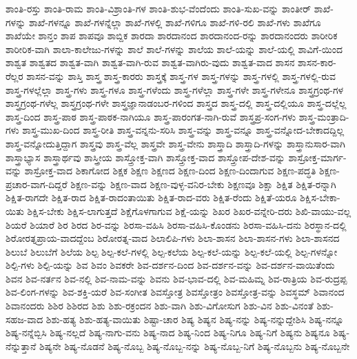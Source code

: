{ಶಾಂತಿ-ರಸ್ತು
ಶಾಂತಿ-ರಾಮ
ಶಾಂತಿ-ವಿಶ್ರಾಂತಿ-ಗಳ
ಶಾಂತಿ-ಶುಭ-ವೆಂದೆಂದು
ಶಾಂತಿ-ಸುಖ-ವನ್ನು
ಶಾಂತೀರ್
ಶಾಖೆ-ಗಳನ್ನು
ಶಾಖೆ-ಗಳನ್ನೂ
ಶಾಖೆ-ಗಳನ್ನೆಲ್ಲಾ
ಶಾಖೆ-ಗಳಲ್ಲಿ
ಶಾಖೆ-ಗಳಿಗೂ
ಶಾಖೆ-ಗಳಿ-ರಲಿ
ಶಾಖೆ-ಗಳು
ಶಾಖೆಗೂ
ಶಾಖೆಯೇ
ಶಾನ್ತಂ
ಶಾಪ
ಶಾಪವೂ
ಶಾಬ್ದಿಕ
ಶಾರದಾ
ಶಾರದಾನಂದ
ಶಾರದಾನಂದ-ರನ್ನು
ಶಾರದಾನಂದರು
ಶಾರೀರಿಕ
ಶಾರೀರಿಕ-ವಾಗಿ
ಶಾಲಾ-ಕಾಲೇಜು-ಗಳನ್ನು
ಶಾಲೆ
ಶಾಲೆ-ಗಳನ್ನು
ಶಾಲೆಯ
ಶಾಲೆ-ಯನ್ನು
ಶಾಲೆ-ಯಲ್ಲಿ
ಶಾವಿಗೆ-ಯಿಂದ
ಶಾಶ್ವತ
ಶಾಶ್ವತದ
ಶಾಶ್ವತ-ವಾಗಿ
ಶಾಶ್ವತ-ವಾಗಿ-ರುವ
ಶಾಶ್ವತ-ವಾಗಿರು-ವುದು
ಶಾಶ್ವತ-ವಾದ
ಶಾಸನ
ಶಾಸನ-ಕಾರ-ರೆಲ್ಲರ
ಶಾಸನ-ವನ್ನು
ಶಾಸ್ತಿ
ಶಾಸ್ತ್ರ
ಶಾಸ್ತ್ರ-ಕಾರರು
ಶಾಸ್ತ್ರಕ್ಕೆ
ಶಾಸ್ತ್ರ-ಗಳ
ಶಾಸ್ತ್ರ-ಗಳನ್ನು
ಶಾಸ್ತ್ರ-ಗಳಲ್ಲಿ
ಶಾಸ್ತ್ರ-ಗಳಲ್ಲಿ-ರುವ
ಶಾಸ್ತ್ರ-ಗಳಲ್ಲೆಲ್ಲಾ
ಶಾಸ್ತ್ರ-ಗಳು
ಶಾಸ್ತ್ರ-ಗಳೂ
ಶಾಸ್ತ್ರ-ಗಳೆಂದು
ಶಾಸ್ತ್ರ-ಗಳೆಲ್ಲಾ
ಶಾಸ್ತ್ರ-ಗಳೇ
ಶಾಸ್ತ್ರ-ಗಳೇನೂ
ಶಾಸ್ತ್ರಗ್ರಂಥ-ಗಳ
ಶಾಸ್ತ್ರಗ್ರಂಥ-ಗಳೆಲ್ಲ
ಶಾಸ್ತ್ರಗ್ರಂಥ-ಗಳೇ
ಶಾಸ್ತ್ರಜ್ಞಾನಾಡಂಬರ-ಗಳಿಂದ
ಶಾಸ್ತ್ರದ
ಶಾಸ್ತ್ರ-ದಲ್ಲಿ
ಶಾಸ್ತ್ರ-ದಲ್ಲಿಯೂ
ಶಾಸ್ತ್ರ-ದಲ್ಲೆಲ್ಲ
ಶಾಸ್ತ್ರ-ದಿಂದ
ಶಾಸ್ತ್ರ-ಪಾಠ
ಶಾಸ್ತ್ರ-ಪಾಠಕ-ನಾಗಿಯೂ
ಶಾಸ್ತ್ರ-ಪಾರಂಗತ-ನಾಗಿ-ರುವೆ
ಶಾಸ್ತ್ರಪ್ರ-ಸಂಗ-ಗಳು
ಶಾಸ್ತ್ರ-ಮಂತ್ರಾದಿ-ಗಳು
ಶಾಸ್ತ್ರ-ಮುಖ-ದಿಂದ
ಶಾಸ್ತ್ರ-ರೀತಿ
ಶಾಸ್ತ್ರ-ವನ್ನನು-ಸರಿಸಿ
ಶಾಸ್ತ್ರ-ವನ್ನು
ಶಾಸ್ತ್ರ-ವನ್ನೂ
ಶಾಸ್ತ್ರ-ವನ್ನೋದ-ಬೇಕಾದದ್ದಿಲ್ಲ
ಶಾಸ್ತ್ರ-ವನ್ನೋದುತ್ತಿದ್ದಾಗ
ಶಾಸ್ತ್ರವು
ಶಾಸ್ತ್ರ-ವೆಲ್ಲ
ಶಾಸ್ತ್ರವೇ
ಶಾಸ್ತ್ರ-ವೇನು
ಶಾಸ್ತ್ರಾದಿ
ಶಾಸ್ತ್ರಾದಿ-ಗಳನ್ನು
ಶಾಸ್ತ್ರಾನುಸಾರ-ವಾಗಿ
ಶಾಸ್ತ್ರಾಭ್ಯಾಸ
ಶಾಸ್ತ್ರಾರ್ಥವು
ಶಾಸ್ತ್ರೀಯ
ಶಾಸ್ತ್ರೋಕ್ತ-ವಾಗಿ
ಶಾಸ್ತ್ರೋಕ್ತ-ವಾದ
ಶಾಸ್ತ್ರೋಪ-ದೇಶ-ವನ್ನು
ಶಾಸ್ರೋಕ್ತ-ಮಾರ್ಗ-ವನ್ನು
ಶಾಸ್ರೋಕ್ತ-ವಾದ
ಶಿಕಾಗೋದ
ಶಿಕ್ಷಕ
ಶಿಕ್ಷಣ
ಶಿಕ್ಷಣದ
ಶಿಕ್ಷಣ-ದಿಂದ
ಶಿಕ್ಷಣ-ದಿಂದಾಗುವ
ಶಿಕ್ಷಣ-ಪದ್ಧತಿ
ಶಿಕ್ಷಣ-ಪ್ರಚಾರ-ವಾಗ-ದಿದ್ದರೆ
ಶಿಕ್ಷಣ-ವನ್ನು
ಶಿಕ್ಷಣ-ವಾದ
ಶಿಕ್ಷಣ-ವುಳ್ಳ-ವನಿರ-ಬೇಕು
ಶಿಕ್ಷಣವೂ
ಶಿಕ್ಷಾ
ಶಿಕ್ಷಿತ
ಶಿಕ್ಷಿತ-ರನ್ನಾಗಿ
ಶಿಕ್ಷಿತ-ರಾಗದೇ
ಶಿಕ್ಷಿತ-ರಾದ
ಶಿಕ್ಷಿತ-ರಾದಂತಾಯಿತು
ಶಿಕ್ಷಿತ-ರಾದ-ವರು
ಶಿಕ್ಷಿತ-ರೆಂದು
ಶಿಕ್ಷಿತೆ-ಯರೂ
ಶಿಕ್ಷಿಸ-ಬೇಕಾ-ಯಿತು
ಶಿಕ್ಷಿಸ-ಬೇಕು
ಶಿಕ್ಷಿಸ-ಲಾಗುತ್ತದೆ
ಶಿಕ್ಷೆಗೊಳಗಾಗುವ
ಶಿಕ್ಷೆ-ಯನ್ನು
ಶಿಖರ
ಶಿಖರ-ವನ್ನೇರಿ-ದರು
ಶಿಖಿ-ವಾಯು-ವಲ್ಲ
ಶಿಯರೆ
ಶಿಯಾರೆ
ಶಿರ
ಶಿರದ
ಶಿರ-ವನ್ನು
ಶಿರಸಾ-ವಹಿಸಿ
ಶಿರಸಾ-ವಹಿಸಿ-ಕೊಂಡನು
ಶಿರಸಾ-ವಹಿಸಿ-ದನು
ಶಿರಸ್ಥಾನ-ದಲ್ಲಿ
ಶಿರೋರತ್ನಪ್ರಾಯ-ವಾದದ್ದೆಂಬ
ಶಿರೋರತ್ನ-ವಾದ
ಶಿಲಾಲಿಪಿ-ಗಳು
ಶಿಲಾ-ಶಾಸನ
ಶಿಲಾ-ಶಾಸನ-ಗಳು
ಶಿಲಾ-ಶಾಸನದ
ಶಿಲುಬೆ
ಶಿಲುಬೆಗೆ
ಶಿಲೆಯ
ಶಿಲ್ಪ
ಶಿಲ್ಪ-ಕಲೆ-ಗಳಲ್ಲಿ
ಶಿಲ್ಪ-ಕಲೆಯ
ಶಿಲ್ಪ-ಕಲೆ-ಯನ್ನು
ಶಿಲ್ಪ-ಕಲೆ-ಯಲ್ಲಿ
ಶಿಲ್ಪ-ಗಳನ್ನೋ
ಶಿಲ್ಪಿ-ಗಳು
ಶಿಲ್ಪಿ-ಯನ್ನು
ಶಿವ
ಶಿವಂ
ಶಿವಕರೇ
ಶಿವ-ದರ್ಶನ-ದಿಂದ
ಶಿವ-ದರ್ಶನ-ವನ್ನು
ಶಿವ-ದರ್ಶನ-ವಾಯಿತೆಂದು
ಶಿವನ
ಶಿವ-ನರ್ತನ
ಶಿವ-ನಲ್ಲಿ
ಶಿವ-ನಾಮ-ವನ್ನು
ಶಿವನು
ಶಿವ-ಭಾವ-ದಲ್ಲಿ
ಶಿವ-ಮಹಿಮ್ನ
ಶಿವ-ರಾತ್ರಿಯ
ಶಿವ-ರುದ್ರಪ್ಪ
ಶಿವ-ಲಿಂಗ-ಗಳನ್ನು
ಶಿವ-ಶಕ್ತಿ-ಯರೆ
ಶಿವ-ಸಂಗೀತ
ಶಿವಸ್ತೋತ್ರ
ಶಿವಸ್ತೋತ್ರಂ
ಶಿವಸ್ತೋತ್ರ-ವನ್ನು
ಶಿವಸ್ಥಮ್
ಶಿವಾನಂದ
ಶಿವಾನಂದರು
ಶಿಶಿರ
ಶಿಶಿರದ
ಶಿಶು
ಶಿಶು-ರಕ್ರಂದನ
ಶಿಶು-ವಾಗಿ
ಶಿಶು-ವಿಗೋಸುಗ
ಶಿಶು-ವಿನ
ಶಿಶು-ವಿನಂತೆ
ಶಿಶು-ಸಹಜ-ವಾದ
ಶಿಶು-ಹತ್ಯ
ಶಿಶು-ಹತ್ಯ-ವಾಯಿತು
ಶಿಷ್ಟಾ-ಚಾರ
ಶಿಷ್ಯ
ಶಿಷ್ಯನ
ಶಿಷ್ಯ-ನನ್ನು
ಶಿಷ್ಯ-ನನ್ನುದ್ದೇಶಿಸಿ
ಶಿಷ್ಯ-ನನ್ನೂ
ಶಿಷ್ಯ-ನನ್ನೆಬ್ಬಿಸಿ
ಶಿಷ್ಯ-ನಲ್ಲದೆ
ಶಿಷ್ಯ-ನಾಗು-ವನು
ಶಿಷ್ಯ-ನಾದ
ಶಿಷ್ಯ-ನಿಂದ
ಶಿಷ್ಯ-ನಿಗೂ
ಶಿಷ್ಯ-ನಿಗೆ
ಶಿಷ್ಯನು
ಶಿಷ್ಯನೂ
ಶಿಷ್ಯ-ನೆನ್ನುತ್ತಾನೆ
ಶಿಷ್ಯನೇ
ಶಿಷ್ಯ-ನೊಡನೆ
ಶಿಷ್ಯ-ನೊಬ್ಬ
ಶಿಷ್ಯ-ನೊಬ್ಬ-ನನ್ನು
ಶಿಷ್ಯ-ನೊಬ್ಬ-ನಿಗೆ
ಶಿಷ್ಯ-ನೊಬ್ಬನು
ಶಿಷ್ಯ-ನೊಬ್ಬನೇ
}
